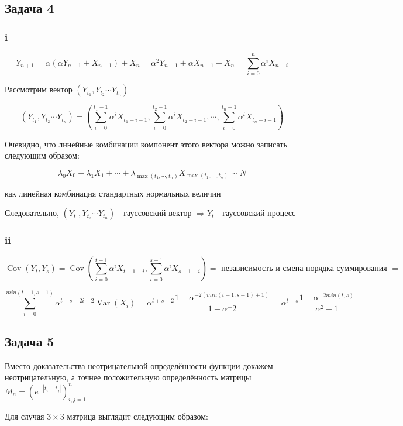 \documentclass[a4paper,12pt]{article}
\def \cov{{\operatorname{Cov}}}
\DeclareMathOperator{\Var}{Var}
\begin{document}
\subsection{Задача 4}

\subsubsection{i}
\[ Y_{n+1} = \alpha (\alpha Y_{n-1} + X_{n-1}) + X_n = \alpha^2 Y_{n-1} + \alpha X_{n-1} + X_n = \sum_{i = 0}^{n} \alpha^i X_{n-i}\]

Рассмотрим вектор $  (Y_{t_1}, Y_{t_2} \cdots Y_{t_n})  $

\[ (Y_{t_1}, Y_{t_2} \cdots Y_{t_n}) = \left( \sum_{i = 0}^{t_1 - 1} \alpha^i X_{t_1-i - 1},  \sum_{i = 0}^{t_2 - 1} \alpha^i X_{t_2-i - 1}, \cdots,  \sum_{i = 0}^{t_n - 1} \alpha^i X_{t_n-i - 1} \right) \]

Очевидно, что линейные комбинации компонент этого вектора можно записать следующим образом:

\[ \lambda_0 X_0 + \lambda_1 X_1 + \cdots + \lambda_{\max(t_1, \cdots, t_n)} X_{\max(t_1, \cdots, t_n)} \sim N \]

как линейная комбинация стандартных нормальных величин

Следовательно, $  (Y_{t_1}, Y_{t_2} \cdots Y_{t_n}) $ - гауссовский вектор $ \Rightarrow Y_t $  - гауссовский процесс


\subsubsection{ii}

\[ \cov(Y_t, Y_s) = \cov(\sum_{i = 0}^{t-1} \alpha^i X_{t-1-i}, \sum_{i = 0}^{s-1} \alpha^i X_{s-1-i})  = \text{ независимость и смена порядка суммирования } =
\] 

\[\sum_{i = 0}^{min(t-1, s-1)} \alpha^{t+s-2i-2} \Var(X_i) = \alpha^{t+s-2} \frac{1 - \alpha^{-2(min(t-1,s-1) + 1)}}{1 - \alpha^-2} = \alpha^{t+s} \frac{1 - \alpha^{-2min(t,s)}}{\alpha^2 - 1} \]


\subsection{Задача 5}

Вместо доказательства неотрицательной определённости функции докажем неотрицательную, а точнее положительную определённость матрицы $ M_{n}=\left(e^{-\left|t_{i}-t_{j}\right|}\right)_{i, j=1}^{n} $

Для случая $ 3 \times 3 $ матрица выглядит следующим образом:
\end{document}
